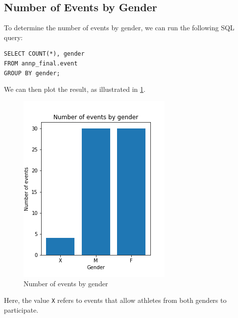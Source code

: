 \subsection{Number of Events by Gender}\label{subsec:number-of-events-by-gender}

To determine the number of events by gender, we can run the following SQL query:

\begin{verbatim}
SELECT COUNT(*), gender
FROM annp_final.event
GROUP BY gender;
\end{verbatim}

We can then plot the result, as illustrated in \cref{fig:eventsbygender}.

\begin{figure}[H]
    \centering
    \includegraphics[width=.4\textwidth]{img/eventsbygender}
    \caption{Number of events by gender}
    \label{fig:eventsbygender}
\end{figure}

Here, the value \texttt{X} refers to events that allow athletes from both genders to participate.
